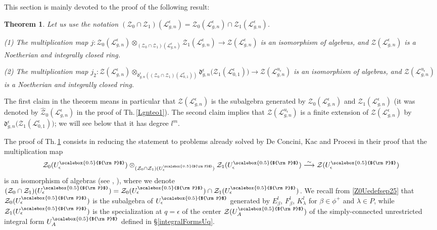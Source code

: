 \documentclass[11pt]{amsart}
\newtheorem{teo}{Theorem}[section]
\newcommand{\e}{\epsilon}
\newcommand{\Ll}{\mathcal{L}}
\newcommand{\Pup}{{\scalebox{0.5}{${\rm P}$}}}
\begin{document}
This section is mainly devoted to the proof of the following result:
\begin{teo}\label{Lgnteo3}
Let us use the notation $(\mathcal{Z}_0 \cap \mathcal{Z}_1)(\mathcal{L}_{g,n}^{\e}) = \mathcal{Z}_0(\mathcal{L}_{g,n}^{\e}) \cap \mathcal{Z}_1(\mathcal{L}_{g,n}^{\e})$.

\noindent (1) The multiplication map $j\colon \mathcal{Z}_0(\mathcal{L}_{g,n}^{\e}) \otimes_{(\mathcal{Z}_0 \cap \mathcal{Z}_1)(\mathcal{L}_{g,n}^{\e})} \mathcal{Z}_1(\mathcal{L}_{g,n}^{\e}) \to \mathcal{Z}(\Ll_{g,n}^{\e})$ is an isomorphism of algebras, and $\mathcal{Z}(\Ll_{g,n}^{\e})$ is a Noetherian and integrally closed ring.

\noindent (2) The multiplication map $j_2\colon \mathcal{Z}(\Ll_{g,n}^{\e}) \otimes_{\mathfrak{d}_{g,n}^{\e}\left((\mathcal{Z}_0\cap \mathcal{Z}_1)(\Ll_{0,1}^\e)\right)} \mathfrak{d}_{g,n}^{\e}\bigl( \mathcal{Z}_1(\Ll_{0,1}^\e) \bigr)\to \mathcal{Z}(\Ll_{g,n}^{u_\e})$ is an isomorphism of algebras, and $\mathcal{Z}(\mathcal{L}_{g,n}^{u_\e})$ is a Noetherian and integrally closed ring.
\end{teo}
\noindent The first claim in the theorem means in particular that $\mathcal{Z}(\Ll_{g,n}^{\e})$ is the subalgebra generated by $\mathcal{Z}_0(\mathcal{L}_{g,n}^{\e})$ and $\mathcal{Z}_1(\mathcal{L}_{g,n}^{\e})$ (it was denoted by $\hat{\mathcal{Z}}_0(\Ll_{g,n}^{\e})$ in the proof of Th.\,\ref{Lgnteo1}). The second claim implies that $\mathcal{Z}(\Ll_{g,n}^{u_\e})$ is a finite extension of $\mathcal{Z}(\Ll_{g,n}^{\e})$ by $\mathfrak{d}_{g,n}^{\e}\bigl( \mathcal{Z}_1(\Ll_{0,1}^\e) \bigr)$; we will see below that it has degree $l^m$.

\smallskip

The proof of Th.\,\ref{Lgnteo3} consists in reducing the statement to problems already solved by De Concini, Kac and Procesi in their proof that the multiplication map
\begin{equation}\label{factoCenterDCP}
\mathcal{Z}_0(U_\e^\Pup) \otimes_{(\mathcal{Z}_0 \cap \mathcal{Z}_1)(U_\e^\Pup)} \mathcal{Z}_1(U_\e^\Pup) \overset{\sim}{\longrightarrow} \mathcal{Z}(U_\e^\Pup)
\end{equation}
is an isomorphism of algebras (see \cite[\S 6.4]{DC-K-P1}, \cite[\S 21]{DCP}), where we denote $(\mathcal{Z}_0 \cap \mathcal{Z}_1)(U_\e^\Pup) = \mathcal{Z}_0 (U_\e^\Pup)\cap \mathcal{Z}_1(U_\e^\Pup)$. We recall from \eqref{Z0Uedefsep25} that $\mathcal{Z}_0(U_\e^\Pup)$ is the subalgebra of $U_\e^\Pup$ generated by $E_\beta^l$, $F_\beta^l$, $K_\lambda^l$ for $\beta \in \phi^+$ and $\lambda \in P$, while $\mathcal{Z}_1(U_\e^\Pup)$ is the specialization at $q=\e$ of the center $\mathcal{Z}(U_A^\Pup)$ of the simply-connected unrestricted integral form $U_A^\Pup$ defined in \S\ref{integralFormsUq}.
\end{document}
